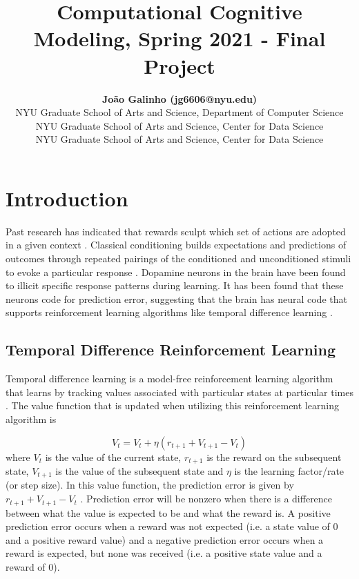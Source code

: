 \documentclass[10pt,letterpaper]{article}
\title{Computational Cognitive Modeling, Spring 2021 - Final Project}
\author{{\large \bf João Galinho (jg6606@nyu.edu)} \\
  NYU Graduate School of Arts and Science, Department of Computer Science
  \AND {\large \bf Sara Okun (sjo302@nyu.edu)} \\
  NYU Graduate School of Arts and Science, Center for Data Science
  \AND {\large \bf Keshav Pant (kp2749@nyu.edu)} \\
  NYU Graduate School of Arts and Science, Center for Data Science}
\begin{document}
\maketitle


\section{Introduction}
Past research has indicated that rewards sculpt which set of actions are adopted in a given context \cite{Bitterman2006, Pavlov1927, Schreurs2013}. Classical conditioning builds expectations and predictions of outcomes through repeated pairings of the conditioned and unconditioned stimuli to evoke a particular response \cite{Bitterman2006, Pavlov1927}. Dopamine neurons in the brain have been found to illicit specific response patterns during learning. It has been found that these neurons code for prediction error, suggesting that the brain has neural code that supports reinforcement learning algorithms like temporal difference learning \cite{Schultz2016}. 


\subsection{Temporal Difference Reinforcement Learning}
Temporal difference learning is a model-free reinforcement learning algorithm that learns by tracking values associated with particular states at particular times \cite{SimonDaw2012}. The value function that is updated when utilizing this reinforcement learning algorithm is

\begin{equation}
V_t = V_t + \eta(r_{t+1} + V_{t+1} - V_t)
\end{equation}
where $V_t$ is the value of the current state, $r_{t+1}$ is the reward on the subsequent state, $V_{t+1}$ is the value of the subsequent state and $\eta$ is the learning factor/rate (or step size). In this value function, the prediction error is given by $r_{t+1} + V_{t+1} - V_t$ \cite{Pan2005}. Prediction error will be nonzero when there is a difference between what the value is expected to be and what the reward is. A positive prediction error occurs when a reward was not expected (i.e. a state value of 0 and a positive reward value) and a negative prediction error occurs when a reward is expected, but none was received (i.e. a positive state value and a reward of 0).
\end{document}
